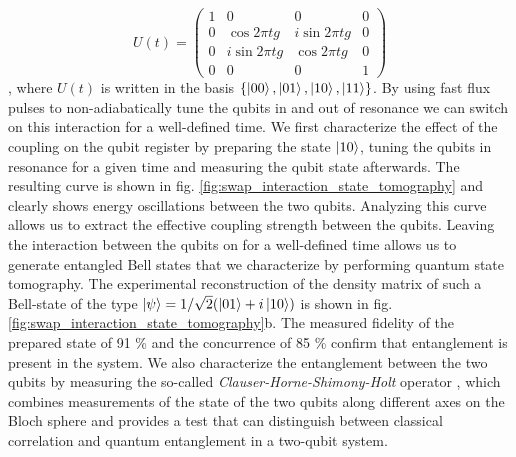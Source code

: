 \begin{equation}
	U(t)  =  \left( \begin{array}{cccc} 1 & 0 & 0 & 0 \\ 0 & \cos{2 \pi t g} & i\sin{2 \pi t g} & 0 \\ 0 & i\sin{2 \pi t g} & \cos{2 \pi t g} & 0 \\ 0 & 0 & 0 & 1 \end{array} \right) \label{eq:swap_evolution_operator}
\end{equation}
, where $U(t)$ is written in the basis $\{\left| 00 \right>,\left| 01 \right>,\left| 10 \right>,\left| 11 \right>\}$. By using fast flux pulses to non-adiabatically tune the qubits in and out of resonance we can switch on this interaction for a well-defined time. We first characterize the effect of the coupling on the qubit register by preparing the state $\left| 10 \right>$, tuning the qubits in resonance for a given time and measuring the  qubit state afterwards. The resulting curve is shown in fig. \ref{fig:swap_interaction_state_tomography} and clearly shows energy oscillations between the two qubits. Analyzing this curve allows us to extract the effective coupling strength between the qubits. Leaving the interaction between the qubits on for a well-defined time allows us to generate entangled Bell states that we characterize by performing quantum state tomography. The experimental reconstruction of the density matrix of such a Bell-state of the type $\left| \psi \right> = 1/\sqrt{2}(\left| 01 \right>+i\left| 10 \right>)$ is shown in fig. \ref{fig:swap_interaction_state_tomography}b. The measured fidelity of the prepared state of 91 \% and the concurrence of 85 \% confirm that entanglement is present in the system. We also characterize the entanglement between the two qubits by measuring the so-called {\it Clauser-Horne-Shimony-Holt} operator \citep{clauser_proposed_1969}, which combines measurements of the state of the two qubits along different axes on the Bloch sphere and provides a test that can distinguish between classical correlation and quantum entanglement in a two-qubit system.

